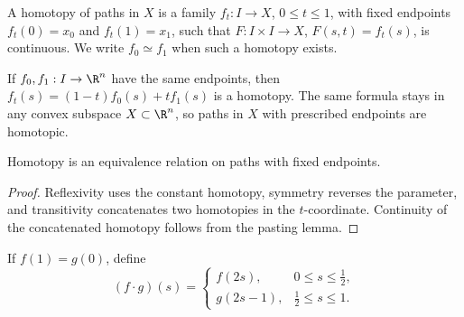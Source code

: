 \begin{definition}
\label{def:homotopy-of-paths}
\leanok
{}
A homotopy of paths in $X$ is a family $f_t:I\to X$, $0\leq t\leq1$, with fixed
endpoints $f_t(0)=x_0$ and $f_t(1)=x_1$, such that
$F:I\times I\to X$, $F(s,t)=f_t(s)$, is continuous. We write $f_0\simeq f_1$
when such a homotopy exists.
\end{definition}

\begin{example}
\label{ex:linear-homotopies-convex}
\leanok
{}
If $f_0,f_1:I\to\R^n$ have the same endpoints, then
$f_t(s)=(1-t)f_0(s)+tf_1(s)$ is a homotopy. The same formula stays in any
convex subspace $X\subset\R^n$, so paths in $X$ with prescribed endpoints are
homotopic.
\end{example}

\begin{proposition}
\label{prop:homotopy-paths-equivalence-relation}
\leanok
{}
Homotopy is an equivalence relation on paths with fixed endpoints.
\end{proposition}

\begin{proof}
\leanok
\sketch Reflexivity uses the constant homotopy, symmetry reverses the parameter,
and transitivity concatenates two homotopies in the $t$-coordinate. Continuity
of the concatenated homotopy follows from the pasting lemma.
\end{proof}

\begin{definition}
\label{def:path-composition}
\leanok
{}
If $f(1)=g(0)$, define
\[
(f\cdot g)(s)=\begin{cases}f(2s),&0\leq s\leq\frac12,\\
g(2s-1),&\frac12\leq s\leq1.
\end{cases}
\]
\end{definition}

